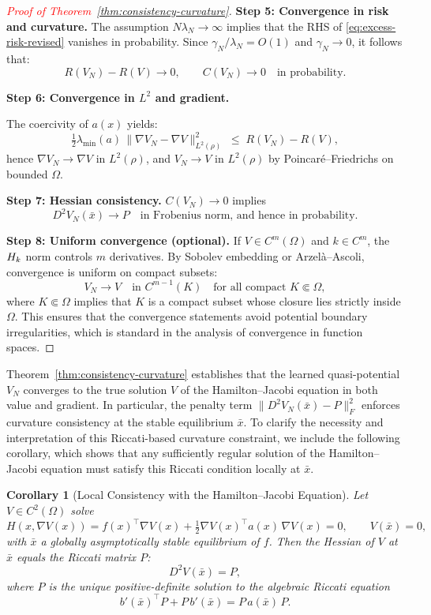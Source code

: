 \documentclass[11pt]{article}
\theoremstyle{plain}      %
\newtheorem{corollary}[theorem]{Corollary}
\theoremstyle{definition} %
\begin{document}
\begin{proof}[\textcolor{red}{Proof of Theorem~\ref{thm:consistency-curvature}}]
\medskip
\noindent\textbf{Step 5: Convergence in risk and curvature.}
The assumption $N\lambda_{N}\to\infty$ implies that the RHS of \eqref{eq:excess-risk-revised} vanishes in probability. Since $\gamma_{N}/\lambda_{N}=O(1)$ and $\gamma_{N}\to 0$, it follows that:
\[
R(V_N) - R(V) \to 0, \qquad C(V_N) \to 0 \quad \text{in probability}.
\]

\medskip
\noindent\textbf{Step 6: Convergence in \boldmath$L^2$ and gradient.}

The coercivity of $a(x)$ yields:
\[
  \tfrac12\lambda_{\min}(a)\,
  \|\nabla V_{N}-\nabla V\|^{2}_{L^{2}(\rho)}
  \;\le\; R(V_{N})-R(V),
\]
hence $\nabla V_{N} \to \nabla V$ in $L^2(\rho)$, and $V_N \to V$ in $L^2(\rho)$ by Poincaré–Friedrichs on bounded $\Omega$.

\medskip
\noindent\textbf{Step 7: Hessian consistency.}
$C(V_N) \to 0$ implies
\[
D^2 V_N(\bar x) \to P \quad \text{in Frobenius norm, and hence in probability}.
\]

\medskip
\noindent\textbf{Step 8: Uniform convergence (optional).}
If $V\in C^m(\Omega)$ and $k\in C^m$, the $\mathcal \mathcal{H}_k$ norm controls $m$ derivatives. By Sobolev embedding or Arzelà–Ascoli, convergence is uniform on compact subsets:
\[
V_N \to V \quad \text{in } C^{m-1}(K) \quad \text{for all compact } K \Subset  \Omega,
\]
where $K \Subset \Omega$ implies that $K$ is a compact subset whose closure lies strictly inside $\Omega$. This ensures that the convergence statements avoid potential boundary irregularities, which is standard in the analysis of convergence in function spaces.

\vspace{-1.2\baselineskip}
\end{proof}

\vspace{0.5em}
\noindent

Theorem~\ref{thm:consistency-curvature} establishes that the learned quasi-potential $V_N$ converges to the true solution $V$ of the Hamilton--Jacobi equation in both value and gradient. In particular, the penalty term $\|D^2 V_N(\bar{x}) - P\|_F^2$ enforces curvature consistency at the stable equilibrium $\bar{x}$. To clarify the necessity and interpretation of this Riccati-based curvature constraint, we include the following corollary, which shows that any sufficiently regular solution of the Hamilton--Jacobi equation must satisfy this Riccati condition locally at $\bar{x}$.

\begin{corollary}[Local Consistency with the Hamilton–Jacobi Equation]\label{cor:localHJ}
Let $V \in C^{2}(\Omega)$ solve
\[
H(x,\nabla V(x))
=f(x)^\top \nabla V(x)
+\tfrac{1}{2}\nabla V(x)^\top a(x)\,\nabla V(x)=0,
\qquad V(\bar{x})=0,
\]
with $\bar{x}$ a globally asymptotically stable equilibrium of $f$.
Then the Hessian of $V$ at $\bar{x}$ equals the Riccati matrix $P$:
\[
D^{2}V(\bar{x})=P,
\]
where $P$ is the unique positive-definite solution to the algebraic Riccati equation
\[
b'(\bar{x})^\top P + P\,b'(\bar{x}) = P\,a(\bar{x})\,P.
\]
\end{corollary}
\end{document}
